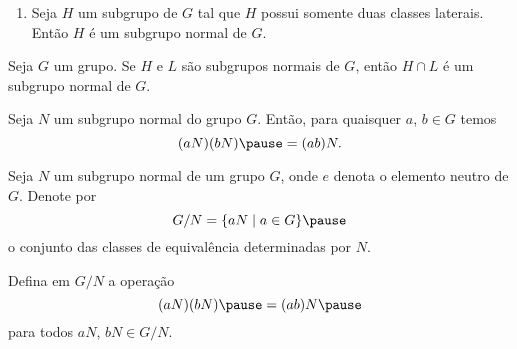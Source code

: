 \documentclass{beamer}
\begin{document}
    \begin{frame}
        \begin{exemplos}
            \begin{enumerate}[label=({\arabic*})]
                \conti

                \item Seja $H$ um subgrupo de $G$ \pause tal que $H$ possui somente duas classes laterais. \pause Então $H$ é um subgrupo normal de $G$.

                \seti
            \end{enumerate}
        \end{exemplos}
    \end{frame}

    \begin{frame}
        \begin{proposicao}
            Seja $G$ um grupo. \pause Se $H$ e $L$ são subgrupos normais de $G$, \pause então $H \cap L$ \pause é um subgrupo normal de $G$.
        \end{proposicao}
    \end{frame}

    \begin{frame}
        \begin{proposicao}
            Seja $N$ um subgrupo normal \pause do grupo $G$. \pause Então, para quaisquer $a$, $b \in G$ temos \pause
            \[
                (aN)(bN) \pause = (ab)N.
            \]
        \end{proposicao}
    \end{frame}

    \begin{frame}
        Seja $N$ um subgrupo normal \pause de um grupo $G$, onde $e$ denota o elemento neutro de $G$. \pause Denote por \pause
        \[
            G/N = \{aN \mid a \in G\} \pause
        \]
        o conjunto das classes de equivalência determinadas por $N$. \pause

        \vspace{.5cm}

        Defina em $G/N$ a operação \pause
        \[
            (aN)(bN)  \pause = (ab)N \pause
        \]
        para todos $aN$, $bN \in G/N$.
    \end{frame}
\end{document}

